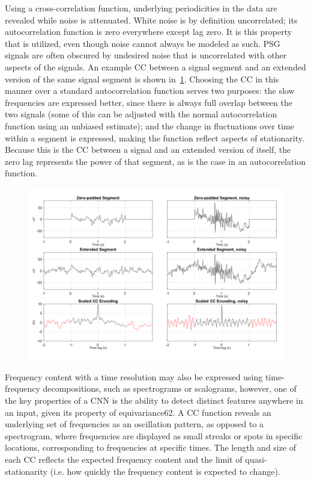Using a cross-correlation function, underlying periodicities in the data are revealed while noise is attenuated. White noise is by definition uncorrelated; its autocorrelation function is zero everywhere except lag zero. It is this property that is utilized, even though noise cannot always be modeled as such. PSG signals are often obscured by undesired noise that is uncorrelated with other aspects of the signals. An example CC between a signal segment and an extended version of the same signal segment is shown in~\cref{fig:paperiii-suppfigure05}. Choosing the CC in this manner over a standard autocorrelation function serves two purposes: the slow frequencies are expressed better, since there is always full overlap between the two signals (some of this can be adjusted with the normal autocorrelation function using an unbiased estimate); and the change in fluctuations over time within a segment is expressed, making the function reflect aspects of stationarity. Because this is the CC between a signal and an extended version of itself, the zero lag represents the power of that segment, as is the case in an autocorrelation function.
\begin{figure}[tb]
    \centering
    \includegraphics[width=\textwidth]{figures/paper-iii/SuppFigure_5.png}
    \caption{}
    \label{fig:paperiii-suppfigure05}
\end{figure}

Frequency content with a time resolution may also be expressed using time-frequency decompositions, such as spectrograms or scalograms, however, one of the key properties of a CNN is the ability to detect distinct features anywhere in an input, given its property of equivariance62. A CC function reveals an underlying set of frequencies as an oscillation pattern, as opposed to a spectrogram, where frequencies are displayed as small streaks or spots in specific locations, corresponding to frequencies at specific times. The length and size of each CC reflects the expected frequency content and the limit of quasi-stationarity (i.e. how quickly the frequency content is expected to change).

